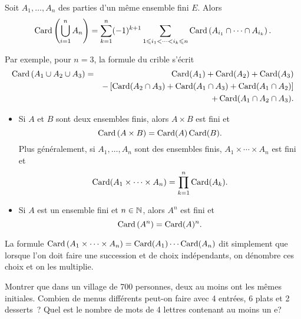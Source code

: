 \documentclass{magnolia}
\begin{document}
\begin{proposition}[nom={Formule du crible}]
Soit $A_1,\ldots,A_n$ des parties d'un même ensemble fini $E$. Alors
  \[\operatorname{Card}\left(\bigcup_{i=1}^n A_n\right)=\sum_{k=1}^n (-1)^{k+1}
    \sum_{1\leqslant i_1<\cdots<i_k\leqslant n}
    \operatorname{Card}\left(A_{i_1}\cap\cdots\cap A_{i_k}\right).\]
\end{proposition}

\begin{remarqueUnique}
\remarque   Par exemple, pour $n=3$, la formule du crible s'écrit
\begin{eqnarray*}
\operatorname{Card}\left(A_1\cup A_2\cup A_3\right)&=&\operatorname{Card}(A_1)+\operatorname{Card}(A_2)+\operatorname{Card}(A_3)\\
  & & - \left[\operatorname{Card}(A_2\cap A_3)+\operatorname{Card}(A_1\cap A_3)+\operatorname{Card}(A_1\cap A_2)\right]\\
& &+\operatorname{Card}(A_1\cap A_2\cap A_3).
\end{eqnarray*}
\end{remarqueUnique}

\begin{proposition}
\begin{itemize}
\item Si $A$ et $B$ sont deux ensembles finis, alors $A\times B$ est fini et
  \[\operatorname{Card}\left(A\times B\right)=\operatorname{Card}(A)\operatorname{Card}(B).\]
  Plus généralement, si $A_1,\ldots,A_n$ sont des ensembles finis,
  $A_1\times\cdots\times A_n$ est fini et
  \[\operatorname{Card}(A_1\times \cdots\times A_n)=\prod_{k=1}^n \operatorname{Card}(A_k).\]
\item Si $A$ est un ensemble fini et $n\in\mathbb{N}$, alors $A^n$ est fini et
  \[\operatorname{Card}\left(A^n\right)=\operatorname{Card}(A)^n.\]
\end{itemize}
\end{proposition}


\begin{remarqueUnique}
\remarque La formule $\operatorname{Card}\left(A_1 \times \dots \times A_n\right)=\operatorname{Card}(A_1)\cdots\operatorname{Card}(A_n)$ dit
  simplement que lorsque l'on doit faire une succession \og et \fg de choix indépendants,
  on dénombre ces choix et on les multiplie.
\end{remarqueUnique}

\begin{exos}
\exo Montrer que dans un village de 700 personnes, deux au moins ont les mêmes initiales.
\exo Combien de menus différents peut-on faire avec 4 entrées, 6 plats et 2 desserts~?
\exo Quel est le nombre de mots de 4 lettres contenant au moins un \og e\fg ? 
\end{exos}
  
\end{document}

